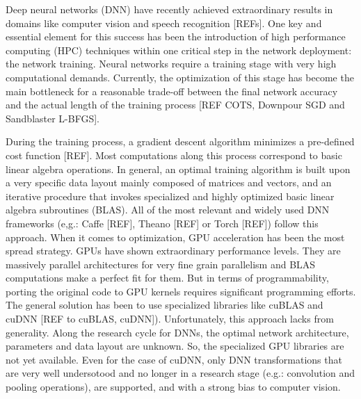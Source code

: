 Deep neural networks (DNN) have recently achieved extraordinary 
results in domains like computer vision and speech recognition [REFs]. 
One key and essential element for this success
has been the introduction of high performance computing (HPC)
techniques within one critical step in the network deployment: the
network training. Neural networks require a training stage with
very high computational demands. Currently, the optimization of this stage
has become the main bottleneck for a reasonable trade-off between the
final network accuracy and the actual length of the
training process [REF COTS, Downpour SGD and Sandblaster 
L-BFGS]. 

During the training process, a gradient descent algorithm minimizes a pre-defined cost function [REF]. Most computations
along this process correspond to basic linear algebra operations. In
general, an optimal training algorithm is built upon a very specific 
data layout mainly composed of matrices and vectors, and an iterative
procedure that invokes specialized and highly optimized basic
linear algebra subroutines (BLAS). All of the most relevant and
widely used DNN frameworks (e,g.: Caffe [REF], Theano [REF]
or Torch [REF]) follow this approach. When it comes to optimization, 
GPU acceleration has been the most spread strategy. GPUs have
shown extraordinary performance levels. They are massively
parallel architectures for very fine grain parallelism and BLAS
computations make a perfect fit for them. But in terms of programmability,
porting the original code to GPU kernels requires significant programming 
efforts. The general solution has been to use specialized 
libraries like cuBLAS and cuDNN [REF to cuBLAS,
cuDNN]). Unfortunately, this approach lacks from generality.
Along the research cycle for DNNs, the optimal network architecture,
parameters and data layout are unknown. So, the specialized
GPU libraries are not yet available. Even for the case of cuDNN,
only DNN transformations that are very well undersotood and no 
longer in a research stage (e.g.: convolution and pooling operations),
are supported, and with a strong bias to computer vision.

